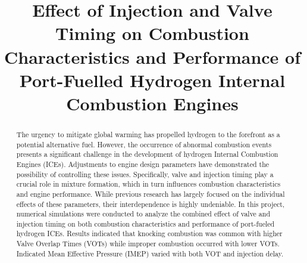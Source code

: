 \documentclass[conference]{IEEEtran}
\begin{document}
\title{Effect of Injection and Valve Timing on Combustion Characteristics and Performance of Port-Fuelled Hydrogen Internal Combustion Engines
}

\author{
\and
{}
\and
{}
\and
{}
\and
{}
}

\maketitle

\begin{abstract}
The urgency to mitigate global warming has propelled hydrogen to the forefront as a potential alternative fuel. 
However, the occurrence of abnormal combustion events presents a significant challenge in the development of hydrogen Internal Combustion Engines (ICEs). 
Adjustments to engine design parameters have demonstrated the possibility of controlling these issues. 
Specifically, valve and injection timing play a crucial role in mixture formation, which in turn influences combustion characteristics and engine performance. 
While previous research has largely focused on the individual effects of these parameters, their interdependence is highly undeniable. 
In this project, numerical simulations were conducted to analyze the combined effect of valve and injection timing on both combustion characteristics and performance of port-fueled hydrogen ICEs. 
Results indicated that knocking combustion was common with higher Valve Overlap Times (VOTs) while improper combustion occurred with lower VOTs. 
Indicated Mean Effective Pressure (IMEP) varied with both VOT and injection delay.

\end{abstract}
\end{document}
